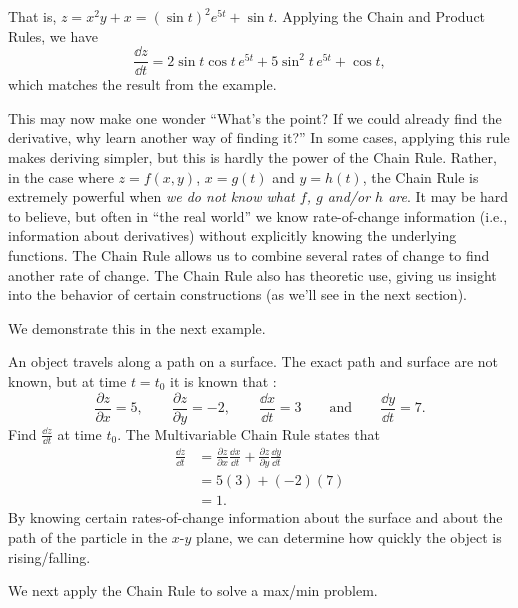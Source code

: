 That is, $z = x^2y+x = (\sin t)^2e^{5t}+\sin t.$ Applying the Chain and Product Rules, we have 
\[\frac{\dd z}{\dd t} = 2\sin t\cos t\, e^{5t}+ 5\sin^2t\,e^{5t}+\cos t,\]
which matches the result from the example.

This may now make one wonder ``What's the point? If we could already find the derivative, why learn another way of finding it?'' In some cases, applying this rule makes deriving simpler, but this is hardly the power of the Chain Rule. Rather, in the case where $z=f(x,y)$, $x=g(t)$ and $y=h(t)$, the Chain Rule is extremely powerful when \emph{we do not know what $f$, $g$ and/or $h$ are}. It may be hard to believe, but often in ``the real world'' we know rate-of-change information (i.e., information about derivatives) without explicitly knowing the underlying functions. The Chain Rule allows us to combine several rates of change to find another rate of change. The Chain Rule also has theoretic use, giving us insight into the behavior of certain constructions (as we'll see in the next section).

We demonstrate this in the next example.

\begin{example}\label{ex_mchain100}
An object travels along a path on a surface. The exact path and surface are not known, but at time $t=t_0$ it is known that :
\[\frac{\partial z}{\partial x} = 5,\qquad \frac{\partial z}{\partial y}=-2,\qquad \frac{\dd x}{\dd t}=3\qquad \text{and}\qquad \frac{\dd y}{\dd t}=7.\]
Find $\frac{\dd z}{\dd t}$ at time $t_0$.
\solution
The Multivariable Chain Rule states that 
\begin{align*}
\frac{\dd z}{\dd t} &= \frac{\partial z}{\partial x}\frac{\dd x}{\dd t} + \frac{\partial z}{\partial y}\frac{\dd y}{\dd t} \\
				&= 5(3)+(-2)(7) \\
				&=1.
\end{align*}
By knowing certain rates-of-change information about the surface and about the path of the particle in the $x$-$y$ plane, we can determine how quickly the object is rising/falling.
\end{example}

We next apply the Chain Rule to solve a max/min problem.


